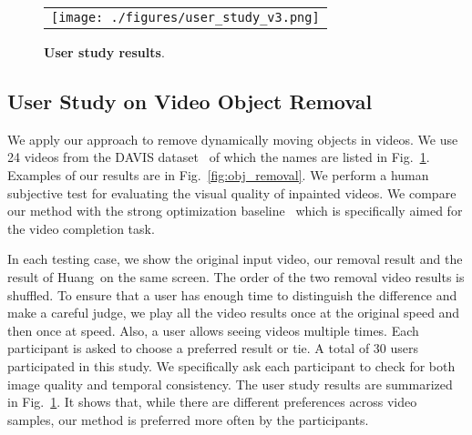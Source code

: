 \documentclass[10pt,twocolumn,letterpaper]{article}
\newcommand{\figref}[1]{Fig.~\ref{#1}}
\begin{document}
\begin{figure}[t]
\begin{center}
\def\arraystretch{1.0}
\begin{tabular}{@{}c@{}}
    \texttt{[image: ./figures/user\_study\_v3.png]}\\
\end{tabular}
\end{center}
\vspace{-6mm}
\caption{\textbf{User study results}.}
\label{fig:user}
\end{figure}

\subsection{User Study on Video Object Removal}
We apply our approach to remove dynamically moving objects in videos. We use 24 videos from the DAVIS dataset~\cite{perazzi2016benchmark,pont20172017} of which the names are listed in \figref{fig:user}. Examples of our results are in \figref{fig:obj_removal}. We perform a human subjective test for evaluating the visual quality of inpainted videos. We compare our method with the strong optimization baseline~\cite{huang2016temporally} which is specifically aimed for the video completion task. 


In each testing case, we show the original input video, our removal result and the result of Huang~\etal on the same screen. The order of the two removal video results is shuffled. To ensure that a user has enough time to distinguish the difference and make a careful judge, we play all the video results once at the original speed and then once at  speed. Also, a user allows seeing videos multiple times. Each participant is asked to choose a preferred result or tie. A total of 30 users participated in this study. We specifically ask each participant to check for both image quality and temporal consistency. The user study results are summarized in \figref{fig:user}. It shows that, while there are different preferences across video samples, our method is preferred more often by the participants.
\end{document}
